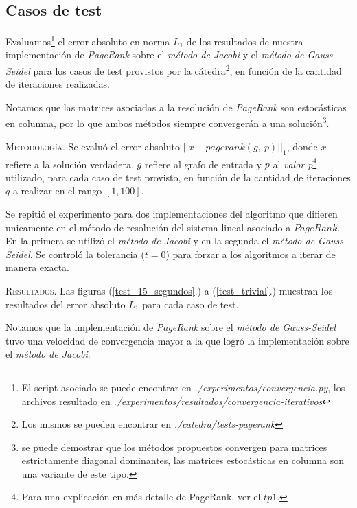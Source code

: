 \vspace{2em}
\subsection{Casos de test}

Evaluamos\footnote{El script asociado se puede encontrar en \textit{./experimentos/convergencia.py}, los archivos resultado en \textit{./experimentos/resultados/convergencia-iterativos}} el error absoluto en norma $L_1$ de los resultados de nuestra implementación de \textit{PageRank} sobre el \textit{método de Jacobi} y el \textit{método de Gauss-Seidel} para los casos de test provistos por la cátedra\footnote{Los mismos se pueden encontrar en \textit{./catedra/tests-pagerank}}, en función de la cantidad de iteraciones realizadas.

Notamos que las matrices asociadas a la resolución de \textit{PageRank} son estocásticas en columna, por lo que ambos métodos siempre convergerán a una solución\footnote{se puede demostrar que los métodos propuestos convergen para matrices estrictamente diagonal dominantes, las matrices estocásticas en columna son una variante de este tipo.}. 

\vspace{2em}
\noindent\textsc{Metodología}. Se evaluó el error absoluto $||x - pagerank(g,\ p)||_1$, donde $x$ refiere a la solución verdadera, $g$ refiere al grafo de entrada y $p$ al \textit{valor p}\footnote{Para una explicación en más detalle de PageRank, ver el $tp1$.} utilizado, para cada caso de test provisto, en función de la cantidad de iteraciones $q$ a realizar en el rango $[1, 100]$.

Se repitió el experimento para dos implementaciones del algoritmo que difieren unicamente en el método de resolución del sistema lineal asociado a $PageRank$. En la primera se utilizó el \textit{método de Jacobi} y en la segunda el \textit{método de Gauss-Seidel}. Se controló la tolerancia ($t = 0$) para forzar a los algoritmos a iterar de manera exacta. 

\vspace{2em}
\noindent\textsc{Resultados}. Las figuras (\ref{test_15_segundos}.) a (\ref{test_trivial}.) muestran los resultados del error absoluto $L_1$ para cada caso de test.

\vspace{1em}
Notamos que la implementación de \textit{PageRank} sobre el \textit{método de Gauss-Seidel} tuvo una velocidad de convergencia mayor a la que logró la implementación sobre el \textit{método de Jacobi}. 

